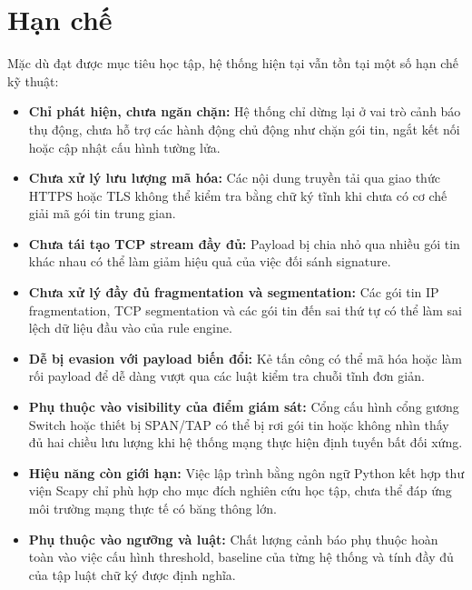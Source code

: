\section{Hạn chế}
Mặc dù đạt được mục tiêu học tập, hệ thống hiện tại vẫn tồn tại một số hạn chế kỹ thuật:
\begin{itemize}
    \item \textbf{Chỉ phát hiện, chưa ngăn chặn:} Hệ thống chỉ dừng lại ở vai trò cảnh báo thụ động, chưa hỗ trợ các hành động chủ động như chặn gói tin, ngắt kết nối hoặc cập nhật cấu hình tường lửa.
    \item \textbf{Chưa xử lý lưu lượng mã hóa:} Các nội dung truyền tải qua giao thức HTTPS hoặc TLS không thể kiểm tra bằng chữ ký tĩnh khi chưa có cơ chế giải mã gói tin trung gian.
    \item \textbf{Chưa tái tạo TCP stream đầy đủ:} Payload bị chia nhỏ qua nhiều gói tin khác nhau có thể làm giảm hiệu quả của việc đối sánh signature.
    \item \textbf{Chưa xử lý đầy đủ fragmentation và segmentation:} Các gói tin IP fragmentation, TCP segmentation và các gói tin đến sai thứ tự có thể làm sai lệch dữ liệu đầu vào của rule engine.
    \item \textbf{Dễ bị evasion với payload biến đổi:} Kẻ tấn công có thể mã hóa hoặc làm rối payload để dễ dàng vượt qua các luật kiểm tra chuỗi tĩnh đơn giản.
    \item \textbf{Phụ thuộc vào visibility của điểm giám sát:} Cổng cấu hình cổng gương Switch hoặc thiết bị SPAN/TAP có thể bị rơi gói tin hoặc không nhìn thấy đủ hai chiều lưu lượng khi hệ thống mạng thực hiện định tuyến bất đối xứng.
    \item \textbf{Hiệu năng còn giới hạn:} Việc lập trình bằng ngôn ngữ Python kết hợp thư viện Scapy chỉ phù hợp cho mục đích nghiên cứu học tập, chưa thể đáp ứng môi trường mạng thực tế có băng thông lớn.
    \item \textbf{Phụ thuộc vào ngưỡng và luật:} Chất lượng cảnh báo phụ thuộc hoàn toàn vào việc cấu hình threshold, baseline của từng hệ thống và tính đầy đủ của tập luật chữ ký được định nghĩa.
\end{itemize}


